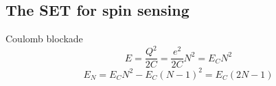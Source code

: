 \documentclass[../main.tex]{subfiles}
\begin{document}
\subsection{The SET for spin sensing}

\begin{frame}{Coulomb blockade}
    \begin{equation*}
    \label{eq:EnergyIsland}
        E = \frac{Q^2}{2C} = \frac{e^2}{2C}N^2 = E_{C}N^2
    \end{equation*}
    \begin{equation*}
    \label{eq:NthEnergyIsland}
        E_{N} = E_{C}N^2 - E_{C}(N-1)^2 = E_{C}(2N - 1)
    \end{equation*}
\end{frame}



%
\end{document}
